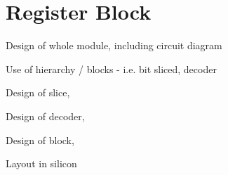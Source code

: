 
\section{Register Block}

Design of whole module, including circuit diagram

Use of hierarchy / blocks - i.e. bit sliced, decoder

Design of slice,

Design of decoder,

Design of block,

Layout in silicon

